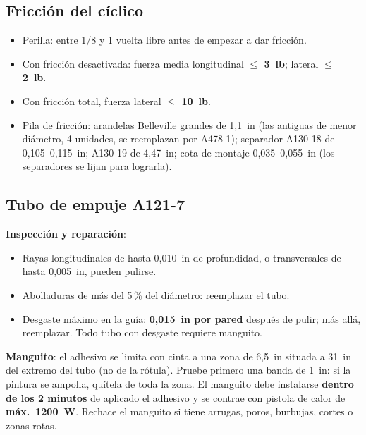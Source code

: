 \subsection{Fricción del cíclico}

\begin{itemize}
\item Perilla: entre 1/8 y 1 vuelta libre antes de empezar a dar fricción.
\item Con fricción desactivada: fuerza media longitudinal \textbf{$\le$ 3~lb}; lateral \textbf{$\le$ 2~lb}.
\item Con fricción total, fuerza lateral \textbf{$\le$ 10~lb}.
\item Pila de fricción: arandelas Belleville grandes de 1,1~in (las antiguas de menor diámetro, 4 unidades, se reemplazan por A478-1); separador A130-18 de 0,105--0,115~in; A130-19 de 4,47~in; cota de montaje 0,035--0,055~in (los separadores se lijan para lograrla).
\end{itemize}

\subsection{Tubo de empuje A121-7}

\textbf{Inspección y reparación}:
\begin{itemize}
\item Rayas longitudinales de hasta 0,010~in de profundidad, o transversales de hasta 0,005~in, pueden pulirse.
\item Abolladuras de más del 5\,\% del diámetro: reemplazar el tubo.
\item Desgaste máximo en la guía: \textbf{0,015~in por pared} después de pulir; más allá, reemplazar. Todo tubo con desgaste requiere manguito.
\end{itemize}

\textbf{Manguito}: el adhesivo se limita con cinta a una zona de 6,5~in situada a 31~in del extremo del tubo (no de la rótula). Pruebe primero una banda de 1~in: si la pintura se ampolla, quítela de toda la zona. El manguito debe instalarse \textbf{dentro de los 2 minutos} de aplicado el adhesivo y se contrae con pistola de calor de \textbf{máx.\ 1200~W}. Rechace el manguito si tiene arrugas, poros, burbujas, cortes o zonas rotas.


